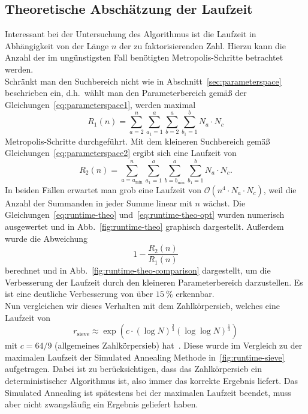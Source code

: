 \subsection{Theoretische Abschätzung der Laufzeit}\label{sec:runtime-theo}
Interessant bei der Untersuchung des Algorithmus ist die Laufzeit in Abhängigkeit von der Länge $n$ der zu faktorisierenden Zahl. Hierzu kann die Anzahl der im ungünstigsten Fall benötigten Metropolis-Schritte betrachtet werden. \\
Schränkt man den Suchbereich nicht wie in Abschnitt~\ref{sec:parameterspace} beschrieben ein, d.h.\ wählt man den Parameterbereich gemäß der Gleichungen~\eqref{eq:parameterspace1}, werden maximal
\begin{equation}
		R_1\left(n\right)=\sum\limits_{a=2}^{n}\sum\limits_{a_1=1}^{a}\sum\limits_{b=2}^{a}\sum\limits_{b_1=1}^{b}N_a\cdot N_c\label{eq:runtime-theo}
\end{equation}
Metropolis-Schritte durchgeführt. Mit dem kleineren Suchbereich gemäß Gleichungen~\eqref{eq:parameterspace2} ergibt sich eine Laufzeit von
\begin{equation}
		R_2\left(n\right)=\sum\limits_{a=a_\mathrm{\min}}^{n}\sum\limits_{a_1=1}^{a}\sum\limits_{b=b_\mathrm{\min}}^{a}\sum\limits_{b_1=1}^{b}N_a\cdot N_c\label{eq:runtime-theo-opt}.
\end{equation}
In beiden Fällen erwartet man grob eine Laufzeit von $\mathcal{O}\left(n^4\cdot N_a\cdot N_c\right)$, weil die Anzahl der Summanden in jeder Summe linear mit $n$ wächst. Die Gleichungen~\eqref{eq:runtime-theo} und~\eqref{eq:runtime-theo-opt} wurden numerisch ausgewertet und in Abb.~\ref{fig:runtime-theo} graphisch dargestellt. Außerdem wurde die Abweichung
\begin{equation*}
		1-\frac{R_2\left(n\right)}{R_1\left(n\right)}
\end{equation*}
berechnet und in Abb.~\ref{fig:runtime-theo-comparison} dargestellt, um die Verbesserung der Laufzeit durch den kleineren Parameterbereich darzustellen. Es ist eine deutliche Verbesserung von über $\SI{15}{\percent}$ erkennbar. \\
Nun vergleichen wir dieses Verhalten mit dem Zahlkörpersieb, welches eine Laufzeit von 
\begin{equation}
		r_\mathrm{sieve}\approx\exp\left(c\cdot{\left(\log N\right)}^\frac{2}{3}{\left(\log\log N\right)}^\frac{1}{3}\right)\label{eq:runtime-sieve}
\end{equation}
mit $c=64/9$ (allgemeines Zahlkörpersieb) hat~\parencite{pomerance}. Diese wurde im Vergleich zu der maximalen Laufzeit der Simulated Annealing Methode in~\ref{fig:runtime-sieve} aufgetragen. Dabei ist zu berücksichtigen, dass das Zahlkörpersieb ein deterministischer Algorithmus ist, also immer das korrekte Ergebnis liefert. Das Simulated Annealing ist spätestens bei der maximalen Laufzeit beendet, muss aber nicht zwangsläufig ein Ergebnis geliefert haben.
